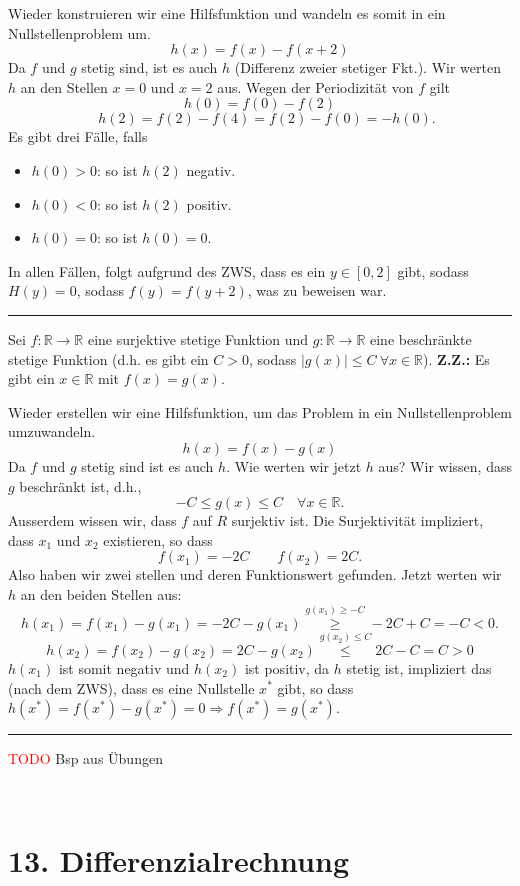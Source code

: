 \documentclass[a4paper,landscape,8pt]{extarticle}
\newcommand{\R}{\mathbb{R}}
\newcommand{\abs}[1]{\left\lvert #1 \right\rvert}
\newcommand{\todo}{\textcolor{red}{TODO }}
\newcommand{\sep}{\vspace{5pt}\noindent\hrule\vspace{5pt}}
\newcommand{\ZZ}{\textbf{Z.Z.: }}
\renewcommand*{\newpage}{ \ }
\begin{document}
\begin{multicols*}{4}
\begin{warmup}
Wieder konstruieren wir eine Hilfsfunktion und wandeln es somit in ein
Nullstellenproblem um.
\[
h(x) = f(x) - f(x+2)
\]
Da $f$ und $g$ stetig sind, ist es auch $h$ (Differenz zweier stetiger Fkt.).
Wir werten $h$ an den Stellen $x=0$ und $x=2$ aus. Wegen der Periodizität von
$f$ gilt
\[
h(0) = f(0) - f(2)
\]
\[
\quad h(2) = f(2) - f(4)= f(2) - f(0)= -h(0).
\]
Es gibt drei Fälle, falls	
\begin{itemize}
  \item $h(0)>0$: so ist $h(2)$ negativ.
  \item $h(0)<0$: so ist $h(2)$ positiv.
  \item $h(0)=0$: so ist $h(0)=0$.
\end{itemize}
In allen Fällen, folgt aufgrund des ZWS, dass es ein $y\in[0,2]$ gibt, sodass
$H(y)=0$, sodass $f(y)=f(y+2)$, was zu beweisen war.

\sep

\Bsp Sei $f\colon\R\to\R$ eine surjektive stetige Funktion und
$g\colon\R\to\R$ eine beschränkte stetige Funktion (d.h. es gibt ein $C>0$,
sodass $\abs{g(x)}\leq C \ \forall x\in\R$). \ZZ Es gibt ein $x\in\R$ mit
$f(x)=g(x)$.

Wieder erstellen wir eine Hilfsfunktion, um das Problem in ein
Nullstellenproblem umzuwandeln.
\[
h(x) = f(x)-g(x)
\]
Da $f$ und $g$ stetig sind ist es auch $h$. Wie werten wir jetzt $h$ aus? Wir
wissen, dass $g$ beschränkt ist, d.h.,
\[
-C\leq g(x) \leq C	 \quad \forall x\in\R.
\]
Ausserdem wissen wir, dass $f$ auf $R$ surjektiv ist. Die Surjektivität
impliziert, dass $x_1$ und $x_2$ existieren, so dass
\[
f(x_1) = -2C \qquad f(x_2) = 2C.
\]
Also haben wir zwei stellen und deren Funktionswert gefunden. Jetzt werten wir
$h$ an den beiden Stellen aus:
\[
h(x_1) = f(x_1) - g(x_1) = -2C - g(x_1) \stackrel{g(x_1)\geq -C} \geq -2C
+ C = -C < 0.
\]
\[
h(x_2) = f(x_2) - g(x_2) = 2C - g(x_2) \stackrel{g(x_2)\leq C} \leq 2C -
C = C >0
\]
$h(x_1)$ ist somit negativ und $h(x_2)$ ist positiv, da $h$ stetig ist,
impliziert das (nach dem ZWS), dass es eine Nullstelle $x^*$ gibt, so dass
$h(x^*)=f(x^*)-g(x^*)=0\Longrightarrow f(x^*) = g(x^*)$.

\sep

\todo Bsp aus Übungen

\end{warmup}

\newpage

\section{13. Differenzialrechnung}


\end{multicols*}
\end{document}

